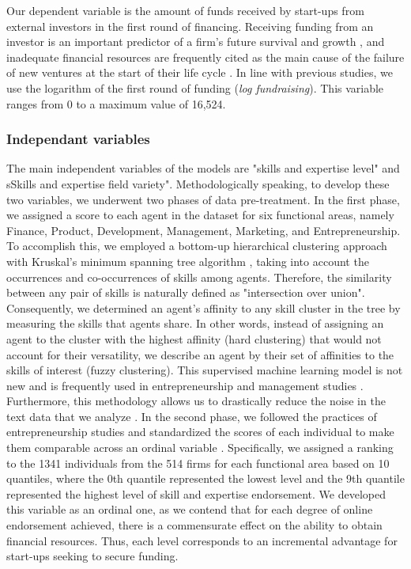 \documentclass[12pt]{article}
\begin{document}
Our dependent variable is the amount of funds received by start-ups from external investors in the first round of financing. Receiving funding from an investor is an important predictor of a firm's future survival and growth \citep{beckman2007early}, and inadequate financial resources are frequently cited as the main cause of the failure of new ventures at the start of their life cycle \citep{franke2008venture, eddleston2016you}. In line with previous studies, we use the logarithm of the first round of funding (\textit{log fundraising}). This variable ranges from 0 to a maximum value of 16,524.

\subsubsection{Independant variables}

The main independent variables of the models are "skills and expertise level" and sSkills and expertise field variety". Methodologically speaking, to develop these two variables, we underwent two phases of data pre-treatment. In the first phase, we assigned a score to each agent in the dataset for six functional areas, namely Finance, Product, Development, Management, Marketing, and Entrepreneurship. To accomplish this, we employed a bottom-up hierarchical clustering approach with Kruskal's minimum spanning tree algorithm \citep{kruskal1956shortest}, taking into account the occurrences and co-occurrences of skills among agents. Therefore, the similarity between any pair of skills is naturally defined as "intersection over union". Consequently, we determined an agent's affinity to any skill cluster in the tree by measuring the skills that agents share. In other words, instead of assigning an agent to the cluster with the highest affinity (hard clustering) that would not account for their versatility, we describe an agent by their set of affinities to the skills of interest (fuzzy clustering). This supervised machine learning model is not new and is frequently used in entrepreneurship and management studies \citep{kaushal2021artificial}. Furthermore, this methodology allows us to drastically reduce the noise in the text data that we analyze \citep{wu2018analysis}. In the second phase, we followed the practices of entrepreneurship studies and standardized the scores of each individual to make them comparable across an ordinal variable \citep{harrison2007s}. Specifically, we assigned a ranking to the 1341 individuals from the 514 firms for each functional area based on 10 quantiles, where the 0th quantile represented the lowest level and the 9th quantile represented the highest level of skill and expertise endorsement. We developed this variable as an ordinal one, as we contend that for each degree of online endorsement achieved, there is a commensurate effect on the ability to obtain financial resources. Thus, each level corresponds to an incremental advantage for start-ups seeking to secure funding.
\end{document}
